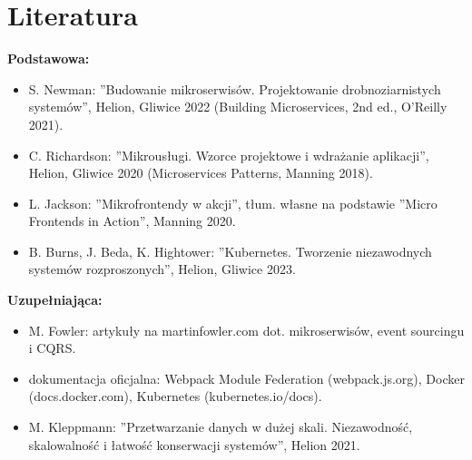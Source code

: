 \documentclass[12pt, a4paper]{article}
\begin{document}
\section{Literatura}

\textbf{Podstawowa:}
\begin{itemize}
  \item S. Newman: ''Budowanie mikroserwisów. Projektowanie drobnoziarnistych systemów'', Helion, Gliwice 2022 (Building Microservices, 2nd ed., O'Reilly 2021).
  \item C. Richardson: ''Mikrousługi. Wzorce projektowe i wdrażanie aplikacji'', Helion, Gliwice 2020 (Microservices Patterns, Manning 2018).
  \item L. Jackson: ''Mikrofrontendy w akcji'', tłum. własne na podstawie ''Micro Frontends in Action'', Manning 2020.
  \item B. Burns, J. Beda, K. Hightower: ''Kubernetes. Tworzenie niezawodnych systemów rozproszonych'', Helion, Gliwice 2023.
\end{itemize}

\textbf{Uzupełniająca:}
\begin{itemize}
  \item M. Fowler: artykuły na martinfowler.com dot. mikroserwisów, event sourcingu i CQRS.
  \item dokumentacja oficjalna: Webpack Module Federation (webpack.js.org), Docker (docs.docker.com), Kubernetes (kubernetes.io/docs).
  \item M. Kleppmann: ''Przetwarzanie danych w dużej skali. Niezawodność, skalowalność i łatwość konserwacji systemów'', Helion 2021.
\end{itemize}
\end{document}
